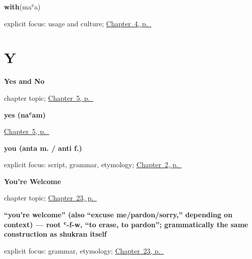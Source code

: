 \noindent\begin{minipage}[t]{\linewidth}
\raggedright
\textbf{with}\enspace\emph{}\enspace(maʿa)\par
\footnotesize explicit focus: usage and culture; \hyperref[ch:ar-farewells]{Chapter~4, p.~\pageref*{ch:ar-farewells}}
\end{minipage}\par\smallskip

\section*{Y}

\noindent\begin{minipage}[t]{\linewidth}
\raggedright
\textbf{Yes and No}\par
\footnotesize chapter topic; \hyperref[ch:ar-yes-and-no]{Chapter~5, p.~\pageref*{ch:ar-yes-and-no}}
\end{minipage}\par\smallskip

\noindent\begin{minipage}[t]{\linewidth}
\raggedright
\textbf{yes (naʿam)}\enspace\emph{}\par
\footnotesize \hyperref[ch:ar-yes-and-no]{Chapter~5, p.~\pageref*{ch:ar-yes-and-no}}
\end{minipage}\par\smallskip

\noindent\begin{minipage}[t]{\linewidth}
\raggedright
\textbf{you (anta m. / anti f.)}\enspace\emph{}\par
\footnotesize explicit focus: script, grammar, etymology; \hyperref[ch:introductions]{Chapter~2, p.~\pageref*{ch:introductions}}
\end{minipage}\par\smallskip

\noindent\begin{minipage}[t]{\linewidth}
\raggedright
\textbf{You're Welcome}\par
\footnotesize chapter topic; \hyperref[ch:ar-youre-welcome]{Chapter~23, p.~\pageref*{ch:ar-youre-welcome}}
\end{minipage}\par\smallskip

\noindent\begin{minipage}[t]{\linewidth}
\raggedright
\textbf{\textquotedblleft{}you're welcome\textquotedblright{} (also \textquotedblleft{}excuse me/pardon/sorry,\textquotedblright{} depending on context) — root ʿ-f-w, \textquotedblleft{}to erase, to pardon\textquotedblright{}; grammatically the same construction as shukran itself}\enspace\emph{}\par
\footnotesize explicit focus: grammar, etymology; \hyperref[ch:ar-youre-welcome]{Chapter~23, p.~\pageref*{ch:ar-youre-welcome}}
\end{minipage}\par\smallskip

